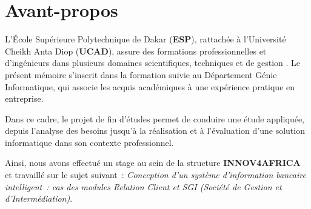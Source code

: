 \chapter*{Avant-propos}
{}

L'École Supérieure Polytechnique de Dakar (\textbf{ESP}), rattachée à
l'Université Cheikh Anta Diop (\textbf{UCAD}), assure des formations
professionnelles et d'ingénieurs dans plusieurs domaines scientifiques,
techniques et de gestion \cite{esp_officiel}. Le présent mémoire s'inscrit dans
la formation suivie au Département Génie Informatique, qui associe les acquis
académiques à une expérience pratique en entreprise.

Dans ce cadre, le projet de fin d'études permet de conduire une étude appliquée,
depuis l'analyse des besoins jusqu'à la réalisation et à l'évaluation d'une
solution informatique dans son contexte professionnel.

Ainsi, nous avons effectué un stage au sein de la structure
\textbf{INNOV4AFRICA} \cite{innov4africa_officiel} et travaillé sur le sujet suivant~:
\textit{Conception d'un système d'information bancaire intelligent~: cas des
modules Relation Client et SGI (Société de Gestion et d'Intermédiation)}.

\cleardoublepage
